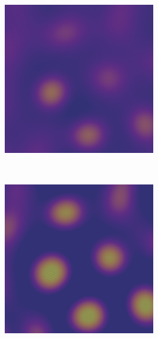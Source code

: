 \documentclass[showkeys, prb, reprint]{revtex4-1}
\begin{document}
\begin{figure}
\begin{subfigure}[b]{0.2\textwidth}
        \includegraphics[width=\textwidth]{early_spinodal}
        \label{fig:early_spinodal}
        \caption{}
    \end{subfigure}
    ~
    \begin{subfigure}[b]{0.2\textwidth}
        \includegraphics[width=\textwidth]{devel_spinodal.png}

\end{subfigure}
\end{figure}
\end{document}
